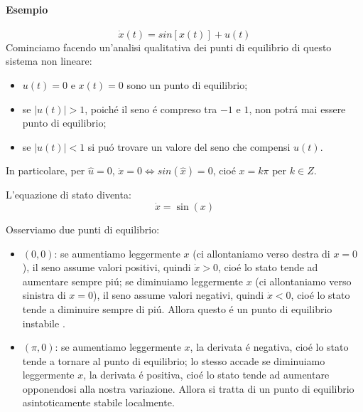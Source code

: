 \documentclass[../main.tex]{subfiles}
\begin{document}
		\begin{mdframed}[style=Esempio]
			\paragraph{Esempio}
			\[
				\dot x(t) = sin\left[ x(t) \right] + u(t)
			\]
			Cominciamo facendo un'analisi qualitativa dei punti di equilibrio di questo sistema non lineare:
			\begin{itemize}
				\item
					$ u(t) = 0 $ e $ x(t) = 0 $ sono un punto di equilibrio;
				\item
					se $ |u(t)|>1 $, poich\'e il seno \'e compreso tra $ -1 $ e $ 1 $, non potr\'a mai essere punto di equilibrio;
				\item
					se $ |u(t)|<1 $ si pu\'o trovare un valore del seno che compensi $ u(t) $. 
			\end{itemize}
			
			\noindent
			In particolare, per $ \hat u = 0 $, $ \dot x = 0 \Leftrightarrow sin(\hat x) = 0 $, cio\'e $ x = k\pi $ per $ k \in Z $.
			
			L'equazione di stato diventa:
			\[
				\dot x = \sin(x)
			\]
			
			Osserviamo due punti di equilibrio:
			\begin{itemize}
				\item
					$ (0,0) $: se aumentiamo leggermente $ x $ (ci allontaniamo verso destra di $ x = 0 $), il seno assume valori positivi, quindi $ \dot x > 0 $, cio\'e lo stato tende ad aumentare sempre pi\'u; se diminuiamo leggermente $ x $ (ci allontaniamo verso sinistra di $ x = 0 $), il seno assume valori negativi, quindi $ \dot x < 0 $, cio\'e lo stato tende a diminuire sempre di pi\'u. Allora questo \'e un punto di equilibrio instabile .
				\item
					$ (\pi, 0) $: se aumentiamo leggermente $ x $, la derivata \'e negativa, cio\'e lo stato tende a tornare al punto di equilibrio; lo stesso accade se diminuiamo leggermente $ x $, la derivata \'e positiva, cio\'e lo stato tende ad aumentare opponendosi alla nostra variazione. Allora si tratta di un punto di equilibrio asintoticamente stabile localmente. 
			\end{itemize}
		

\end{mdframed}
\end{document}
